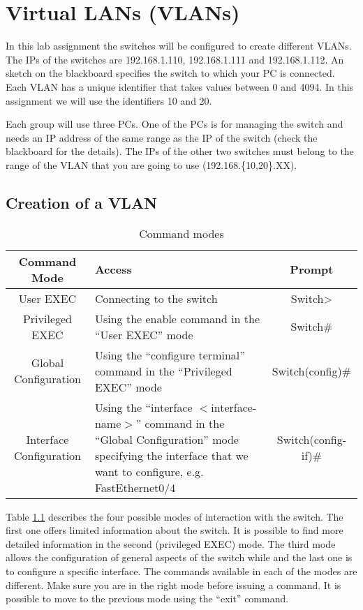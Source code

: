 \chapter{Virtual LANs (VLANs)}

In this lab assignment the switches will be configured to create different VLANs.
The IPs of the switches are 192.168.1.110, 192.168.1.111 and 192.168.1.112.
An sketch on the blackboard specifies the switch to which your PC is connected.
Each VLAN has a unique identifier that takes values between 0 and 4094. 
In this assignment we will use the identifiers 10 and 20.


Each group will use three PCs.
One of the PCs is for managing the switch and needs an IP address of the same range as the IP of the switch (check the blackboard for the details).
The IPs of the other two switches must belong to the range of the VLAN that you are going to use (192.168.\{10,20\}.XX).

\section{Creation of a VLAN}

\begin{table}[!t]
\renewcommand{\arraystretch}{1.3}
\caption{Command modes}
\label{tab:modes}
\centering
\begin{tabular}{|c|p{5cm}|c|}
\hline
Command Mode & Access & Prompt\\
\hline
User EXEC & Connecting to the switch & Switch> \\
Privileged EXEC & Using the enable command in the ``User EXEC'' mode & Switch\# \\
Global Configuration & Using the ``configure terminal'' command in the ``Privileged EXEC'' mode& Switch(config)\# \\
        Interface Configuration & Using the ``interface $<$interface-name$>$'' command in the ``Global Configuration'' mode specifying the interface that we want to configure, e.g. FastEthernet0/4& Switch(config-if)\# \\
\hline
\end{tabular}
\end{table}


Table \ref{tab:modes} describes the four possible modes of interaction with the switch.
The first one offers limited information about the switch.
It is possible to find more detailed information in the second (privileged EXEC) mode.
The third mode allows the configuration of general aspects of the switch while and the last one is to configure a specific interface.
The commands available in each of the modes are different.
Make sure you are in the right mode before issuing a command.
It is possible to move to the previous mode using the ``exit'' command.

